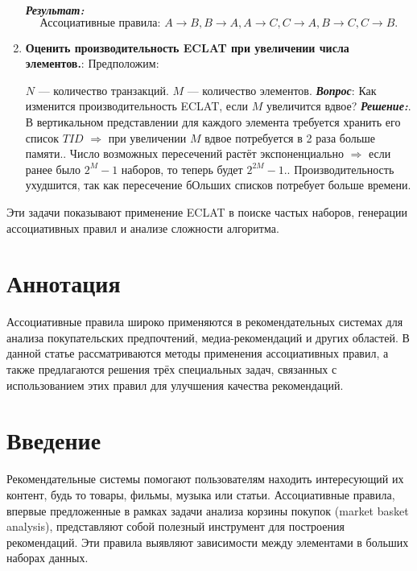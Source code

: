 \begin{enumerate}
{          \textbf{\textit{Результат:}}\newline
          \[
              \text{Ассоциативные правила: } A \rightarrow B, B \rightarrow A, A \rightarrow C, C \rightarrow A, B \rightarrow C, C \rightarrow B.
          \]}
    \item {\textbf{Оценить производительность ECLAT при увеличении числа элементов.}:\newline
          Предположим:\par
          \(N\) — количество транзакций.\newline
          \(M\) — количество элементов.\newline
          \textbf{\textit{Вопрос}}: Как изменится производительность ECLAT, если \(M\) увеличится вдвое?\newline
          \textbf{\textit{Решение:}}. В вертикальном представлении для каждого элемента требуется хранить его список \(TID\) $\Rightarrow$ при увеличении \(M\) вдвое потребуется в 2 раза больше памяти.. Число возможных пересечений растёт экспоненциально $\Rightarrow$ если ранее было \(2^M - 1\) наборов, то теперь будет \(2^{2M} - 1\).. Производительность ухудшится, так как пересечение бОльших списков потребует больше времени.\newline}
\end{enumerate}
Эти задачи показывают применение ECLAT в поиске частых наборов, генерации ассоциативных правил и анализе сложности алгоритма.

\section*{Аннотация}
Ассоциативные правила широко применяются в рекомендательных системах для анализа покупательских предпочтений, медиа-рекомендаций и других областей. В данной статье рассматриваются методы применения ассоциативных правил, а также предлагаются решения трёх специальных задач, связанных с использованием этих правил для улучшения качества рекомендаций.

\tableofcontents

\newpage

\section{Введение}
Рекомендательные системы помогают пользователям находить интересующий их контент, будь то товары, фильмы, музыка или статьи. Ассоциативные правила, впервые предложенные в рамках задачи анализа корзины покупок (market basket analysis), представляют собой полезный инструмент для построения рекомендаций. Эти правила выявляют зависимости между элементами в больших наборах данных.

